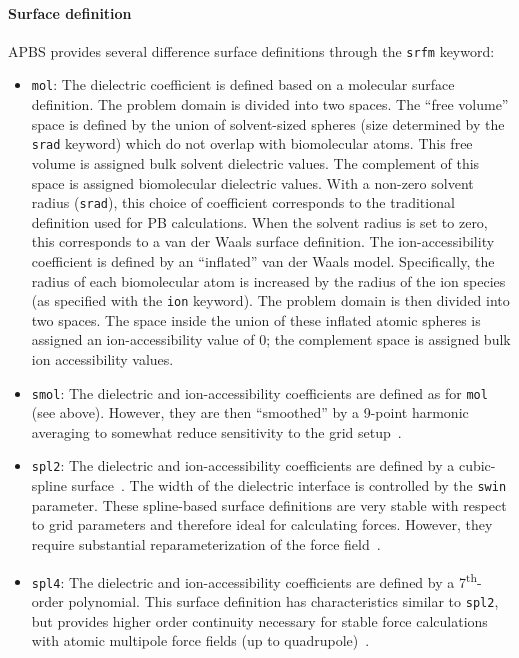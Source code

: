 \documentclass[12pt,titlepage]{article}
\newcommand{\keyword}[1]{\texttt{#1}}
\begin{document}
\paragraph{Surface definition}
APBS provides several difference surface definitions through the \keyword{srfm} keyword:
\begin{itemize}
	\item \keyword{mol}: The dielectric coefficient is defined based on a molecular surface definition.
	The problem domain is divided into two spaces.
	The ``free volume'' space is defined by the union of solvent-sized spheres (size determined by the \keyword{srad} keyword) which do not overlap with biomolecular atoms.
	This free volume is assigned bulk solvent dielectric values.
	The complement of this space is assigned biomolecular dielectric values.
	With a non-zero solvent radius (\keyword{srad}), this choice of coefficient corresponds to the traditional definition used for PB calculations.
	When the solvent radius is set to zero, this corresponds to a van der Waals surface definition.
	The ion-accessibility coefficient is defined by an ``inflated'' van der Waals model.
	Specifically, the radius of each biomolecular atom is increased by the radius of the ion species (as specified with the \keyword{ion} keyword).
	The problem domain is then divided into two spaces.
	The space inside the union of these inflated atomic spheres is assigned an ion-accessibility value of 0; the complement space is assigned bulk ion accessibility values.
	\item \keyword{smol}: The dielectric and ion-accessibility coefficients are defined as for \keyword{mol} (see above).
	However, they are then ``smoothed'' by a 9-point harmonic averaging to somewhat reduce sensitivity to the grid setup~\cite{Bruccoleri1997}.
	\item \keyword{spl2}: The dielectric and ion-accessibility coefficients are defined by a cubic-spline surface~\cite{IBR98}.
	The width of the dielectric interface is controlled by the \keyword{swin} parameter.
	These spline-based surface definitions are very stable with respect to grid parameters and therefore ideal for calculating forces. However, they require substantial reparameterization of the force field~\cite{Nina1999}.
	\item \keyword{spl4}: The dielectric and ion-accessibility coefficients are defined by a 7\textsuperscript{th}-order polynomial.
	This surface definition has characteristics similar to \keyword{spl2}, but provides higher order continuity necessary for stable force calculations with atomic multipole force fields (up to quadrupole)~\cite{Schnieders2007}.
\end{itemize}
\end{document}
